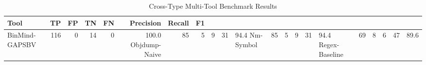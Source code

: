 \begin{table}[htbp]
\centering
\caption{Cross-Type Multi-Tool Benchmark Results}\label{tab:cross}
\begin{tabular}{lrrrrrrr}
\toprule
Tool & TP & FP & TN & FN & Precision & Recall & F1 \\
\midrule
BinMind-GAPSBV & 116 & 0 & 14 & 0 & 100.0%
Objdump-Naive & 85 & 5 & 9 & 31 & 94.4%
Nm-Symbol & 85 & 5 & 9 & 31 & 94.4%
Regex-Baseline & 69 & 8 & 6 & 47 & 89.6%
\bottomrule
\end{tabular}
\end{table}
